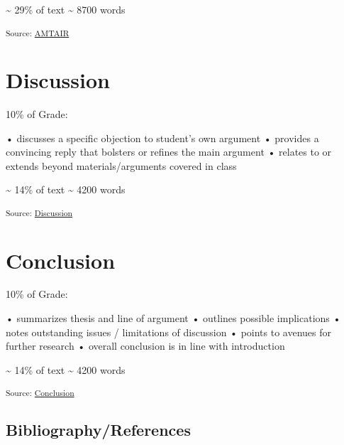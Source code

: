 \documentclass[12pt,a4paper]{book}      %
\begin{document}
\textasciitilde{} 29\% of text \textasciitilde{} 8700 words

\textsubscript{Source:
\href{https://VJMeyer.github.io/submission/chapters/AMTAIR.qmd.html\#66a99f1c-9dd6-40c4-97f6-f977c4a953f1}{AMTAIR}}

\chapter{}\label{section-3}

\chapter{Discussion}\label{discussion}

10\% of Grade:

• discusses a specific objection to student's own argument • provides a
convincing reply that bolsters or refines the main argument • relates to
or extends beyond materials/arguments covered in class

\textasciitilde{} 14\% of text \textasciitilde{} 4200 words

\textsubscript{Source:
\href{https://VJMeyer.github.io/submission/chapters/Discussion.qmd.html\#c5211e2d-0ed7-4ab0-838a-6545f2c41d91}{Discussion}}

\chapter{}\label{section-4}

\chapter{Conclusion}\label{conclusion}

10\% of Grade:

• summarizes thesis and line of argument • outlines possible
implications • notes outstanding issues / limitations of discussion •
points to avenues for further research • overall conclusion is in line
with introduction

\textasciitilde{} 14\% of text \textasciitilde{} 4200 words

\textsubscript{Source:
\href{https://VJMeyer.github.io/submission/chapters/Conclusion.qmd.html\#c14cf960-be7f-4a4a-a8f5-39f3c1bea077}{Conclusion}}

\section*{Bibliography/References}\label{bibliographyreferences}
\end{document}
